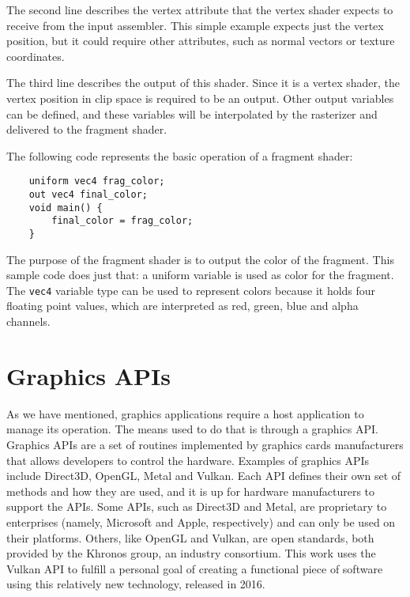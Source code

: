 The second line describes the vertex attribute that the vertex shader expects to receive from the input assembler. This simple example expects just the vertex position, but it could require other attributes, such as normal vectors or texture coordinates.

The third line describes the output of this shader. Since it is a vertex shader, the vertex position in clip space is required to be an output. Other output variables can be defined, and these variables will be interpolated by the rasterizer and delivered to the fragment shader.

The following code represents the basic operation of a fragment shader:

\begin{verbatim}
    uniform vec4 frag_color;
    out vec4 final_color;
    void main() {
        final_color = frag_color;
    }
\end{verbatim}

The purpose of the fragment shader is to output the color of the fragment. This sample code does just that: a uniform variable is used as color for the fragment. The \texttt{vec4} variable type can be used to represent colors because it holds four floating point values, which are interpreted as red, green, blue and alpha channels.

\section{Graphics APIs}
As we have mentioned, graphics applications require a host application to manage its operation. The means used to do that is through a graphics API. Graphics APIs are a set of routines implemented by graphics cards manufacturers that allows developers to control the hardware. Examples of graphics APIs include Direct3D, OpenGL, Metal and Vulkan. Each API defines their own set of methods and how they are used, and it is up for hardware manufacturers to support the APIs. Some APIs, such as Direct3D and Metal, are proprietary to enterprises (namely, Microsoft and Apple, respectively) and can only be used on their platforms. Others, like OpenGL and Vulkan, are open standards, both provided by the Khronos group, an industry consortium. This work uses the Vulkan API to fulfill a personal goal of creating a functional piece of software using this relatively new technology, released in 2016.



%
%

